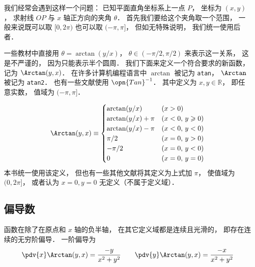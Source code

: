 

我们经常会遇到这样一个问题： 已知平面直角坐标系上一点 $P$， 坐标为 $(x, y)$， 求射线 $OP$ 与 $x$ 轴正方向的夹角 $\theta$．%
首先我们要给这个夹角取一个范围， 一般来说既可以取 $[0, 2\pi)$ 也可以取 $(-\pi, \pi]$， 但如无特殊说明， 我们统一使用后者．

一些教材中直接用 $\theta = \arctan(y/x)$， $\theta \in (-\pi/2, \pi/2)$ 来表示这一关系， 这是不严谨的， 因为只能表示半个圆周． 我们下面来定义一个符合要求的新函数， 记为 $\Arctan(y, x)$． 在许多计算机编程语言中 $\arctan$ 被记为 \lstinline|atan|， $\Arctan$ 被记为 \lstinline|atan2|． 也有一些文献使用 $\opn{Tan}^{-1}$． 其中定义为 $x, y \in \mathbb R$， 即任意实数， 值域为 $(-\pi, \pi]$．

\begin{equation}\label{Arctan_eq1}
\Arctan(y,x) \equiv 
\begin{cases}
\arctan (y/x) \quad &(x > 0)\\
\arctan (y/x) + \pi  &(x < 0,\,y \geqslant 0)\\
\arctan (y/x) - \pi  &(x < 0,\,y < 0)\\
\pi /2  &(x = 0, \,y > 0)\\
 -\pi /2  &(x = 0, \,y < 0)\\
0 & (x=0,\,y=0)
\end{cases}
\end{equation}
本书统一使用该定义， 但也有一些其他文献将其定义为上式加 $\pi$， 使值域为 $(0, 2\pi]$， 或者认为 $x = 0, y = 0$ 无定义（不属于定义域）．

\subsection{偏导数}
函数在除了在原点和 $x$ 轴的负半轴， 在其它定义域都是连续且光滑的， 即存在连续的无穷阶偏导． 一阶偏导为
\begin{equation}
\pdv{x} \Arctan(y, x) = \frac{-y}{x^2 + y^2} \qquad
\pdv{y} \Arctan(y, x) = \frac{-x}{x^2 + y^2}
\end{equation}
